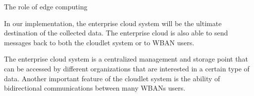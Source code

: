 \documentclass[10pt]{beamer}
\begin{document}
\begin{frame}{The role of edge computing} 

\vspace{0.3cm}

\begin{quoting}[font=itshape, begintext={``}, endtext={''\cite[par.~3.2]{MSAReport}}]
In our implementation, the enterprise cloud system will be the ultimate destination of the collected data. The enterprise cloud is also able to send messages back to both the cloudlet system or to WBAN users.
\end{quoting}

\vspace{0.3cm}

\begin{quoting}[font=itshape, begintext={``}, endtext={''\cite[par.~4.1]{MSAReport}}]
The enterprise cloud system is a centralized management and storage point that can be accessed by different organizations that are interested in a certain type of data. Another important feature of the cloudlet system is the ability of bidirectional communications between many WBANs users.
\end{quoting}

\vspace{0.3cm}

\end{frame} 
\end{document}
